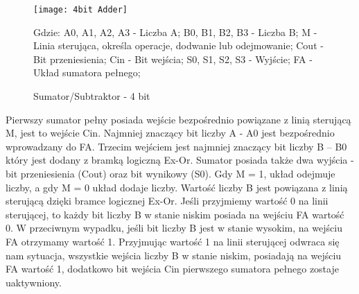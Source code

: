 \documentclass[12pt, a4paper, onside, polish]{article}				%
\begin{document}
 \begin{figure}[hbt!]
{\centering \texttt{[image: 4bit Adder]} \caption{Sumator/Subtraktor - 4 bit}}\vspace{5mm}
Gdzie:\newline
A0, A1, A2, A3 - Liczba A;\newline
B0, B1, B2, B3 - Liczba B;\newline
M - Linia sterująca, określa operacje, dodwanie lub odejmowanie;\newline
Cout - Bit przeniesienia;\newline
Cin - Bit wejścia;\newline
S0, S1, S2, S3 - Wyjście; \newline
FA - Układ sumatora pełnego; \newline\newline
\end{figure}

Pierwszy sumator pełny posiada wejście bezpośrednio powiązane z linią sterującą M, jest to wejście Cin. Najmniej znaczący bit liczby A - A0 jest bezpośrednio wprowadzany do FA. Trzecim wejściem jest najmniej znaczący bit liczby B – B0 który jest dodany z bramką logiczną Ex-Or. Sumator posiada także dwa wyjścia - bit przeniesienia (Cout) oraz bit wynikowy (S0). Gdy M = 1, układ odejmuje liczby, a gdy M = 0 układ dodaje liczby. Wartość liczby B jest powiązana z linią sterującą dzięki bramce logicznej Ex-Or. Jeśli przyjmiemy wartość 0 na linii sterującej, to każdy bit liczby B w stanie niskim posiada na wejściu FA wartość 0.  W przeciwnym wypadku, jeśli bit liczby B jest w stanie wysokim, na wejściu FA otrzymamy wartość 1. Przyjmując wartość 1 na linii sterującej odwraca się nam sytuacja, wszystkie wejścia liczby B w stanie niskim, posiadają na wejściu FA wartość 1, dodatkowo bit wejścia Cin pierwszego sumatora pełnego zostaje uaktywniony.  
\end{document}
